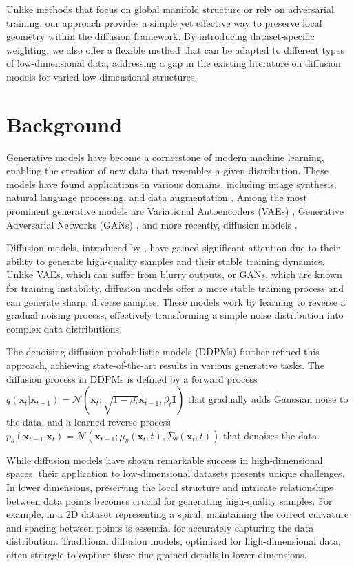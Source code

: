 \documentclass{article} %
\begin{document}
Unlike methods that focus on global manifold structure or rely on adversarial training, our approach provides a simple yet effective way to preserve local geometry within the diffusion framework. By introducing dataset-specific weighting, we also offer a flexible method that can be adapted to different types of low-dimensional data, addressing a gap in the existing literature on diffusion models for varied low-dimensional structures.

\section{Background}
\label{sec:background}

Generative models have become a cornerstone of modern machine learning, enabling the creation of new data that resembles a given distribution. These models have found applications in various domains, including image synthesis, natural language processing, and data augmentation \cite{goodfellow2016deep}. Among the most prominent generative models are Variational Autoencoders (VAEs) \cite{vae}, Generative Adversarial Networks (GANs) \cite{gan}, and more recently, diffusion models \cite{ddpm}.

Diffusion models, introduced by \citet{pmlr-v37-sohl-dickstein15}, have gained significant attention due to their ability to generate high-quality samples and their stable training dynamics. Unlike VAEs, which can suffer from blurry outputs, or GANs, which are known for training instability, diffusion models offer a more stable training process and can generate sharp, diverse samples. These models work by learning to reverse a gradual noising process, effectively transforming a simple noise distribution into complex data distributions.

The denoising diffusion probabilistic models (DDPMs) \cite{ddpm} further refined this approach, achieving state-of-the-art results in various generative tasks. The diffusion process in DDPMs is defined by a forward process $q(\mathbf{x}_t | \mathbf{x}_{t-1}) = \mathcal{N}(\mathbf{x}_t; \sqrt{1-\beta_t}\mathbf{x}_{t-1}, \beta_t\mathbf{I})$ that gradually adds Gaussian noise to the data, and a learned reverse process $p_\theta(\mathbf{x}_{t-1} | \mathbf{x}_t) = \mathcal{N}(\mathbf{x}_{t-1}; \mu_\theta(\mathbf{x}_t, t), \Sigma_\theta(\mathbf{x}_t, t))$ that denoises the data.

While diffusion models have shown remarkable success in high-dimensional spaces, their application to low-dimensional datasets presents unique challenges. In lower dimensions, preserving the local structure and intricate relationships between data points becomes crucial for generating high-quality samples. For example, in a 2D dataset representing a spiral, maintaining the correct curvature and spacing between points is essential for accurately capturing the data distribution. Traditional diffusion models, optimized for high-dimensional data, often struggle to capture these fine-grained details in lower dimensions.
\end{document}
